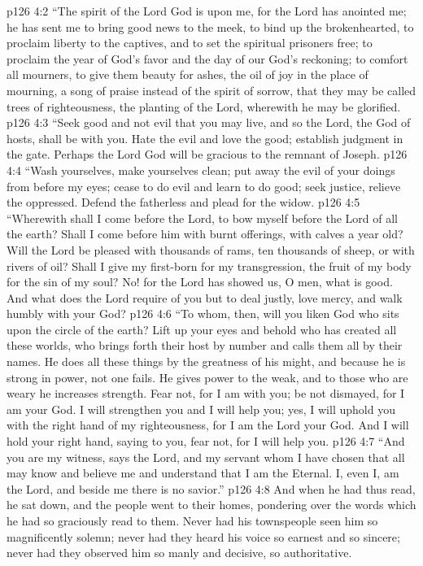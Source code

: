 \pc \vs p126 4:2 “The spirit of the Lord God is upon me, for the Lord has anointed me; he has sent me to bring good news to the meek, to bind up the brokenhearted, to proclaim liberty to the captives, and to set the spiritual prisoners free; to proclaim the year of God’s favor and the day of our God’s reckoning; to comfort all mourners, to give them beauty for ashes, the oil of joy in the place of mourning, a song of praise instead of the spirit of sorrow, that they may be called trees of righteousness, the planting of the Lord, wherewith he may be glorified.
\vs p126 4:3 “Seek good and not evil that you may live, and so the Lord, the God of hosts, shall be with you. Hate the evil and love the good; establish judgment in the gate. Perhaps the Lord God will be gracious to the remnant of Joseph.
\vs p126 4:4 “Wash yourselves, make yourselves clean; put away the evil of your doings from before my eyes; cease to do evil and learn to do good; seek justice, relieve the oppressed. Defend the fatherless and plead for the widow.
\vs p126 4:5 “Wherewith shall I come before the Lord, to bow myself before the Lord of all the earth? Shall I come before him with burnt offerings, with calves a year old? Will the Lord be pleased with thousands of rams, ten thousands of sheep, or with rivers of oil? Shall I give my first\hyp{}born for my transgression, the fruit of my body for the sin of my soul? No! for the Lord has showed us, O men, what is good. And what does the Lord require of you but to deal justly, love mercy, and walk humbly with your God?
\vs p126 4:6 “To whom, then, will you liken God who sits upon the circle of the earth? Lift up your eyes and behold who has created all these worlds, who brings forth their host by number and calls them all by their names. He does all these things by the greatness of his might, and because he is strong in power, not one fails. He gives power to the weak, and to those who are weary he increases strength. Fear not, for I am with you; be not dismayed, for I am your God. I will strengthen you and I will help you; yes, I will uphold you with the right hand of my righteousness, for I am the Lord your God. And I will hold your right hand, saying to you, fear not, for I will help you.
\vs p126 4:7 “And you are my witness, says the Lord, and my servant whom I have chosen that all may know and believe me and understand that I am the Eternal. I, even I, am the Lord, and beside me there is no savior.”
\pc \vs p126 4:8 And when he had thus read, he sat down, and the people went to their homes, pondering over the words which he had so graciously read to them. Never had his townspeople seen him so magnificently solemn; never had they heard his voice so earnest and so sincere; never had they observed him so manly and decisive, so authoritative.
